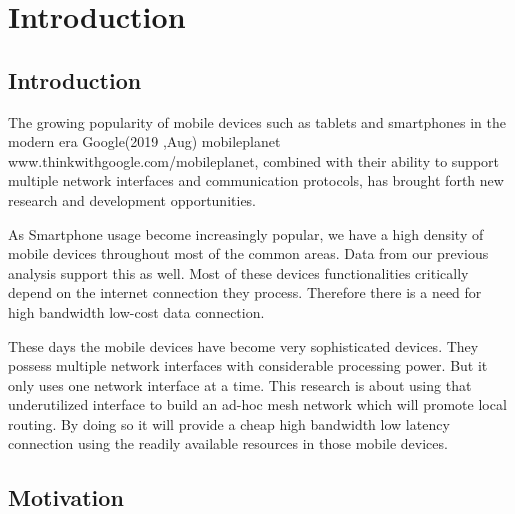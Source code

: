 \chapter{Introduction}
\section{Introduction}


\vspace{12pt}

 
					
The growing popularity of mobile devices such as tablets and smartphones in the modern era Google(2019 ,Aug) mobileplanet www.thinkwithgoogle.com/mobileplanet\cite{ThinkwithGoogle}, combined with their ability to support multiple network interfaces and communication protocols, has brought forth new research and development opportunities.

\vspace{12pt} 

As Smartphone usage become increasingly popular, we have a high density of mobile devices throughout most of the common areas. Data from our previous analysis support this as well. Most of these devices functionalities critically depend on the internet connection they process. Therefore there is a need for high bandwidth low-cost data connection.

\vspace{12pt} 

These days the mobile devices have become very sophisticated devices. They possess multiple network interfaces with considerable processing power. But it only uses one network interface at a time. This research is about using that underutilized interface to build an ad-hoc mesh network which will promote local routing. By doing so it will provide a cheap high bandwidth low latency connection using the readily available resources in those mobile devices.


\vspace{12pt}

\clearpage

\section{Motivation}


\vspace{12pt}

